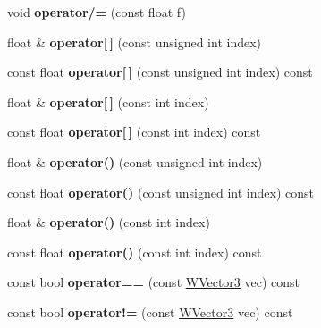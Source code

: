 \begin{DoxyCompactItemize}
\item 
void {\bfseries operator/=} (const float f)\hypertarget{class_w_vector3_a91e67bdace8546dfa170f8ac4f96bbbf}{}\label{class_w_vector3_a91e67bdace8546dfa170f8ac4f96bbbf}

\item 
float \& {\bfseries operator\mbox{[}$\,$\mbox{]}} (const unsigned int index)\hypertarget{class_w_vector3_a9dd07aae0b56f64e7ca22579132f9b99}{}\label{class_w_vector3_a9dd07aae0b56f64e7ca22579132f9b99}

\item 
const float {\bfseries operator\mbox{[}$\,$\mbox{]}} (const unsigned int index) const \hypertarget{class_w_vector3_ab3ae86215fd068727c3919bbbec4378c}{}\label{class_w_vector3_ab3ae86215fd068727c3919bbbec4378c}

\item 
float \& {\bfseries operator\mbox{[}$\,$\mbox{]}} (const int index)\hypertarget{class_w_vector3_ab426b8154b0070ae9f77fe85c203cc49}{}\label{class_w_vector3_ab426b8154b0070ae9f77fe85c203cc49}

\item 
const float {\bfseries operator\mbox{[}$\,$\mbox{]}} (const int index) const \hypertarget{class_w_vector3_a548623de94e5bcbf9b90c43b603a5dc7}{}\label{class_w_vector3_a548623de94e5bcbf9b90c43b603a5dc7}

\item 
float \& {\bfseries operator()} (const unsigned int index)\hypertarget{class_w_vector3_a3abe34f00959343b455f6379808ebb04}{}\label{class_w_vector3_a3abe34f00959343b455f6379808ebb04}

\item 
const float {\bfseries operator()} (const unsigned int index) const \hypertarget{class_w_vector3_aa439bc52e87775bce3ca763329eec6a1}{}\label{class_w_vector3_aa439bc52e87775bce3ca763329eec6a1}

\item 
float \& {\bfseries operator()} (const int index)\hypertarget{class_w_vector3_a603a438d50e72a773f84b140571e59c3}{}\label{class_w_vector3_a603a438d50e72a773f84b140571e59c3}

\item 
const float {\bfseries operator()} (const int index) const \hypertarget{class_w_vector3_a50840eb2927535e088aa02297d6a3214}{}\label{class_w_vector3_a50840eb2927535e088aa02297d6a3214}

\item 
const bool {\bfseries operator==} (const \hyperlink{class_w_vector3}{W\+Vector3} vec) const \hypertarget{class_w_vector3_a2a0ec5f47d1e85682eb7cd87e1e57eed}{}\label{class_w_vector3_a2a0ec5f47d1e85682eb7cd87e1e57eed}

\item 
const bool {\bfseries operator!=} (const \hyperlink{class_w_vector3}{W\+Vector3} vec) const \hypertarget{class_w_vector3_aeb06959c651fdb9f5de55ae0b1b4f6ad}{}\label{class_w_vector3_aeb06959c651fdb9f5de55ae0b1b4f6ad}

\end{DoxyCompactItemize}
